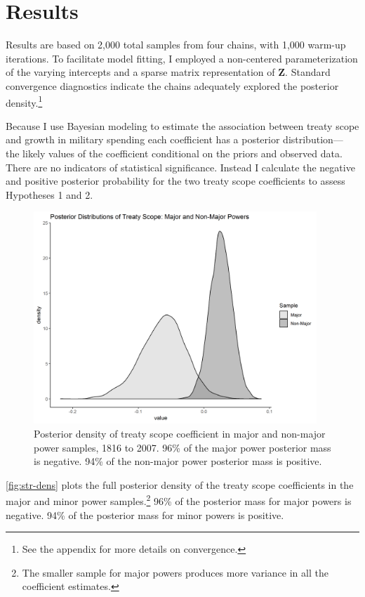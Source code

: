 \documentclass[12pt]{article}
\begin{document}
\section{Results}


Results are based on 2,000 total samples from four chains, with 1,000 warm-up iterations. 
To facilitate model fitting, I employed a non-centered parameterization of the varying intercepts and a sparse matrix representation of \textbf{Z}. 
Standard convergence diagnostics indicate the chains adequately explored the posterior density.\footnote{See the appendix for more details on convergence.} 


Because I use Bayesian modeling to estimate the association between treaty scope and growth in military spending each coefficient has a posterior distribution--- the likely values of the coefficient conditional on the priors and observed data.
There are no indicators of statistical significance. 
Instead I calculate the negative and positive posterior probability for the two treaty scope coefficients to assess Hypotheses 1 and 2.


\begin{figure}[htbp]
	\centering
		\includegraphics[width=0.95\textwidth]{../figures/scope-dens.png}
	\caption{Posterior density of treaty scope coefficient in major and non-major power samples, 1816 to 2007. 96\% of the major power posterior mass is negative. 94\% of the non-major power posterior mass is positive.}
	\label{fig:str-dens}
\end{figure}


\autoref{fig:str-dens} plots the full posterior density of the treaty scope coefficients in the major and minor power samples.\footnote{The smaller sample for major powers produces more variance in all the coefficient estimates.} 
96\% of the posterior mass for major powers is negative. 
94\% of the posterior mass for minor powers is positive. 
\end{document}
